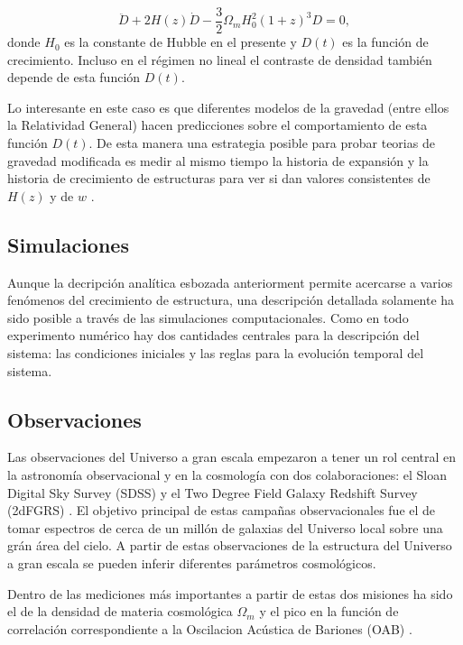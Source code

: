 \documentclass[12pt]{article}
\begin{document}
\begin{equation}
\ddot{D} + 2H(z)\dot{D}- \frac{3}{2}\Omega_mH_{0}^2(1+z)^3D=0,
\end{equation}
%
donde $H_0$ es la constante de Hubble en el presente y $D(t)$ es la
funci\'on de crecimiento. Incluso en el r\'egimen no lineal el
contraste de densidad tambi\'en depende de esta funci\'on $D(t)$.  

Lo interesante en este caso es que diferentes modelos de la gravedad
(entre ellos la Relatividad General) hacen predicciones sobre el
comportamiento de esta funci\'on $D(t)$. De esta manera una estrategia
posible para probar teorias de gravedad modificada es medir al mismo
tiempo la historia de expansi\'on y la historia de crecimiento de
estructuras para ver si dan valores consistentes de $H(z)$ y de
$w$ \cite{2014arXiv1401.0046M}. 

\subsection{Simulaciones}

Aunque la decripci\'on anal\'itica esbozada anteriorment
permite acercarse a varios fen\'omenos del crecimiento de estructura,
una descripci\'on detallada solamente ha sido posible a trav\'es de
las simulaciones computacionales. Como en todo experimento num\'erico
hay dos cantidades centrales para la descripci\'on del sistema: las
condiciones iniciales y las reglas para la evoluci\'on temporal del
sistema. 


\subsection{Observaciones}

Las observaciones del Universo a gran escala empezaron a tener un rol
central en la astronom\'ia observacional y en la cosmolog\'ia con dos
colaboraciones: el Sloan Digital Sky Survey (SDSS) \cite{SDSS} y el Two Degree
Field Galaxy Redshift Survey (2dFGRS) \cite{2dF}. El objetivo
principal de estas campa\~nas observacionales fue el de tomar
espectros de cerca de un mill\'on de galaxias del Universo local sobre
una gr\'an \'area del cielo. A partir de estas observaciones de la
estructura del Universo a gran escala se pueden inferir diferentes
par\'ametros cosmol\'ogicos.

Dentro de las mediciones m\'as importantes a partir de estas dos misiones
ha sido el de la densidad de materia cosmol\'ogica $\Omega_m$
\cite{2001Natur.410..169P} y el pico en la funci\'on de
correlaci\'on correspondiente a la Oscilacion Ac\'ustica de Bariones
(OAB) \cite{Eisenstein2005}.  
\end{document}

